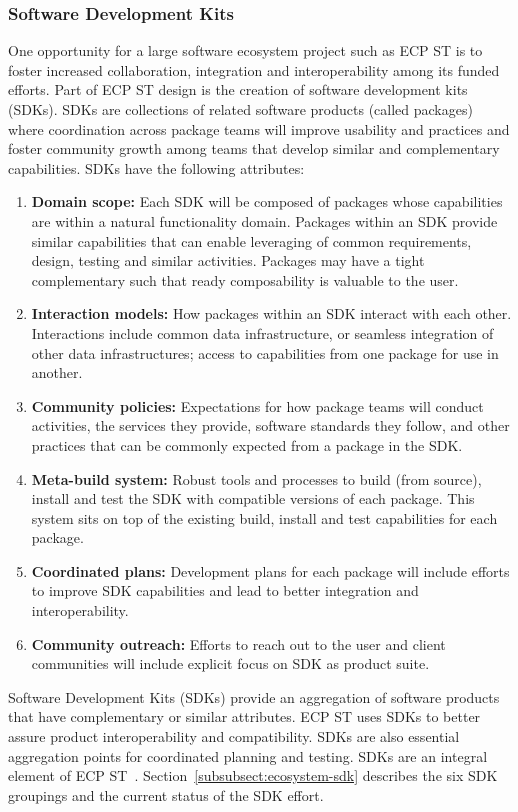 \subsubsection{Software Development Kits}\label{subsubsect:sdks}
One opportunity for a large software ecosystem project such as ECP ST is to foster increased collaboration, integration and interoperability among its funded efforts. Part of ECP ST design is the creation of software development kits (SDKs).  SDKs are collections of related software products (called packages) where coordination across package teams will improve usability and practices and foster community growth among teams that develop similar and complementary capabilities. SDKs have the following attributes:
\begin{table}
	\begin{mdframed}
\begin{enumerate}
	\item \textbf{Domain scope:} Each SDK will be composed of packages whose capabilities are within a natural functionality domain. Packages within an SDK provide similar capabilities that can enable leveraging of common requirements, design, testing and similar activities. Packages may have a tight complementary such that ready composability is valuable to the user.
	\item \textbf{Interaction models:} How packages within an SDK interact with each other. Interactions include common data infrastructure, or seamless integration of other data infrastructures; access to capabilities from one package for use in another.
	\item \textbf{Community policies:} Expectations for how package teams will conduct activities, the services they provide, software standards they follow, and other practices that can be commonly expected from a package in the SDK.
	\item \textbf{Meta-build system:} Robust tools and processes to build (from source), install and test the SDK with compatible versions of each package. This system sits on top of the existing build, install and test capabilities for each package.
	\item \textbf{Coordinated plans:} Development plans for each package will include efforts to improve SDK capabilities and lead to better integration and interoperability.
	\item \textbf{Community outreach:} Efforts to reach out to the user and client communities will include explicit focus on SDK as product suite.
\end{enumerate}
	\end{mdframed}
\caption{\label{table:sdk-attributes} Software Development Kits (SDKs) provide an aggregation of software products that have complementary or similar attributes.  ECP ST uses SDKs to better assure product interoperability and compatibility.  SDKs are also essential aggregation points for coordinated planning and testing. SDKs are an integral element of ECP ST~\cite{Heroux-SDK-Podcast}.  Section~\ref{subsubsect:ecosystem-sdk} describes the six SDK groupings and the current status of the SDK effort.}
\end{table}

